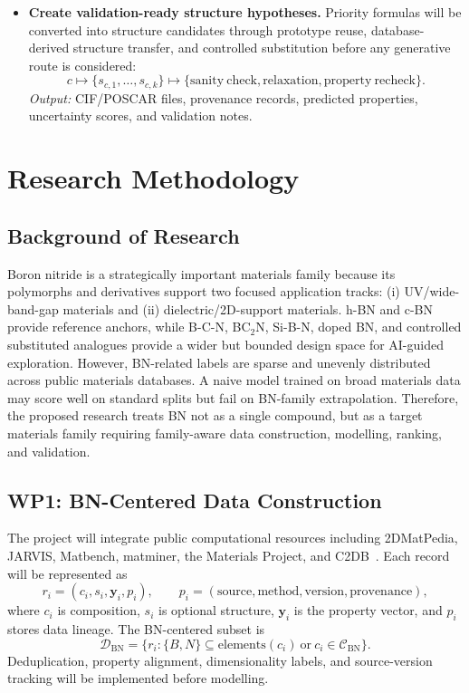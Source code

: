 \documentclass[10pt,a4paper]{article}
\begin{document}
\begin{itemize}[leftmargin=*]
  \item \textbf{Create validation-ready structure hypotheses.} Priority formulas will be converted into structure candidates through prototype reuse, database-derived structure transfer, and controlled substitution before any generative route is considered:
  \[
    c\mapsto\{s_{c,1},\ldots,s_{c,k}\}\mapsto
    \{\mathrm{sanity\ check},\mathrm{relaxation},\mathrm{property\ recheck}\}.
  \]
  \textit{Output:} CIF/POSCAR files, provenance records, predicted properties, uncertainty scores, and validation notes.
\end{itemize}

\section{Research Methodology}
\subsection{Background of Research}
Boron nitride is a strategically important materials family because its polymorphs and derivatives support two focused application tracks: (i) UV/wide-band-gap materials and (ii) dielectric/2D-support materials. h-BN and c-BN provide reference anchors, while B-C-N, BC$_2$N, Si-B-N, doped BN, and controlled substituted analogues provide a wider but bounded design space for AI-guided exploration. However, BN-related labels are sparse and unevenly distributed across public materials databases. A naive model trained on broad materials data may score well on standard splits but fail on BN-family extrapolation. Therefore, the proposed research treats BN not as a single compound, but as a target materials family requiring family-aware data construction, modelling, ranking, and validation.

\subsection{WP1: BN-Centered Data Construction}
The project will integrate public computational resources including 2DMatPedia, JARVIS, Matbench, matminer, the Materials Project, and C2DB~\cite{zhou2019_2dmatpedia,choudhary2020_jarvis,dunn2020_matbench,ward2018_matminer,jain2013_mp,haastrup2018_c2db}. Each record will be represented as
\[
  r_i=(c_i,s_i,\mathbf{y}_i,p_i),\qquad
  p_i=(\mathrm{source},\mathrm{method},\mathrm{version},\mathrm{provenance}),
\]
where $c_i$ is composition, $s_i$ is optional structure, $\mathbf{y}_i$ is the property vector, and $p_i$ stores data lineage. The BN-centered subset is
\[
  \mathcal{D}_{\mathrm{BN}}=\{r_i:\{B,N\}\subseteq\mathrm{elements}(c_i)\ \mathrm{or}\ c_i\in\mathcal{C}_{\mathrm{BN}}\}.
\]
Deduplication, property alignment, dimensionality labels, and source-version tracking will be implemented before modelling.
\end{document}
